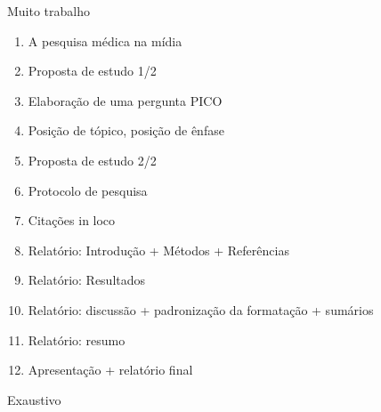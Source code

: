 \documentclass{beamer}
\begin{document}
\begin{frame}{Muito trabalho}
  \begin{enumerate}
    \scriptsize
  \item<1-2,6> A pesquisa médica na mídia
  \item<1-2,3> Proposta de estudo 1/2
  \item<1-2,3> Elaboração de uma pergunta PICO
  \item<1-2,6> Posição de tópico, posição de ênfase
  \item<1-2,3> Proposta de estudo 2/2
  \item<1-2,4> Protocolo de pesquisa
  \item<1-2,6> Citações in loco
  \item<1-2,4> Relatório: Introdução + Métodos + Referências
  \item<1-2,5> Relatório: Resultados
  \item<1-2,5> Relatório: discussão + padronização da formatação + sumários
  \item<1-2,5> Relatório: resumo
  \item<1-2,5> Apresentação + relatório final
  \end{enumerate}

  \begin{center}




  \end{center}
\end{frame}

\begin{frame}
  \begin{center}
    Exaustivo

    \vfill
  \end{center}
\end{frame}
\end{document}
